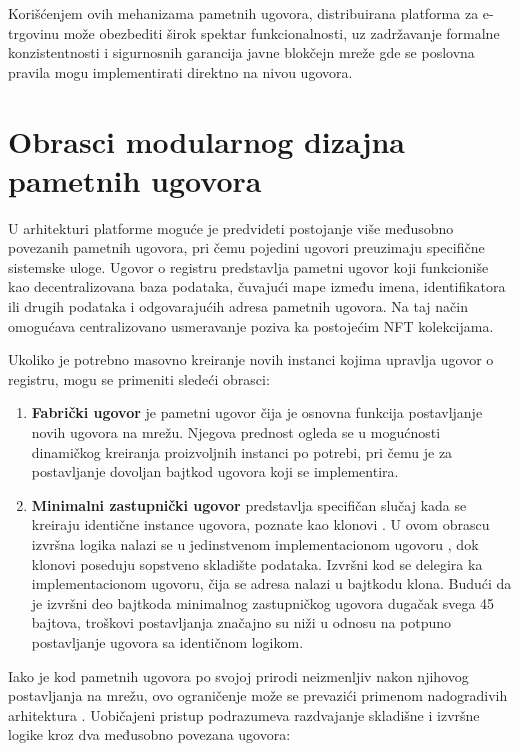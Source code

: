 Korišćenjem ovih mehanizama pametnih ugovora, distribuirana platforma za e-trgovinu može obezbediti širok spektar funkcionalnosti, uz zadržavanje formalne konzistentnosti i sigurnosnih garancija javne blokčejn mreže gde se poslovna pravila mogu implementirati direktno na nivou ugovora.

\section{Obrasci modularnog dizajna pametnih ugovora}
U arhitekturi platforme moguće je predvideti postojanje više međusobno povezanih pametnih ugovora, pri čemu pojedini ugovori preuzimaju specifične sistemske uloge. Ugovor o registru \cite{xu2018pattern}  predstavlja pametni ugovor koji funkcioniše kao decentralizovana baza podataka, čuvajući mape između imena, identifikatora ili drugih podataka i odgovarajućih adresa pametnih ugovora. Na taj način omogućava centralizovano usmeravanje poziva ka postojećim NFT kolekcijama.

Ukoliko je potrebno masovno kreiranje novih instanci kojima upravlja ugovor o registru, mogu se primeniti sledeći obrasci:
\begin{enumerate}
\item \textbf{Fabrički ugovor}  je pametni ugovor čija je osnovna funkcija postavljanje novih ugovora na mrežu. Njegova prednost ogleda se u mogućnosti dinamičkog kreiranja proizvoljnih instanci po potrebi, pri čemu je za postavljanje dovoljan bajtkod ugovora koji se implementira.

\item \textbf{Minimalni zastupnički ugovor} \cite{CLONEeip1167}  predstavlja specifičan slučaj kada se kreiraju identične instance ugovora, poznate kao klonovi . U ovom obrascu izvršna logika nalazi se u jedinstvenom implementacionom ugovoru , dok klonovi poseduju sopstveno skladište podataka. Izvršni kod se delegira ka implementacionom ugovoru, čija se adresa nalazi u bajtkodu klona. Budući da je izvršni deo bajtkoda minimalnog zastupničkog ugovora dugačak svega 45 bajtova, troškovi postavljanja značajno su niži u odnosu na potpuno postavljanje ugovora sa identičnom logikom.
\end{enumerate}

Iako je kod pametnih ugovora po svojoj prirodi neizmenljiv nakon njihovog postavljanja na mrežu, ovo ograničenje može se prevazići primenom nadogradivih arhitektura \cite{meisami2023comprehensive}. Uobičajeni pristup podrazumeva razdvajanje skladišne i izvršne logike kroz dva međusobno povezana ugovora:

